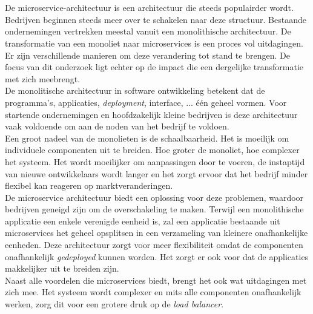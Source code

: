 
\chapter{}
\label{ch:inleiding}

De microservice-architectuur is een architectuur die steeds populairder wordt. Bedrijven beginnen steeds meer over te schakelen naar deze structuur. Bestaande ondernemingen vertrekken meestal vanuit een monolithische architectuur. De transformatie van een monoliet naar microservices is een proces vol uitdagingen. Er zijn verschillende manieren om deze verandering tot stand te brengen. De focus van dit onderzoek ligt echter op de impact die een dergelijke transformatie met zich meebrengt.\\

De monolitische architectuur in software ontwikkeling betekent dat de programma's, applicaties, \emph{deployment}, interface, ... één geheel vormen. Voor startende ondernemingen en hoofdzakelijk kleine bedrijven is deze architectuur vaak voldoende om aan de noden van het bedrijf te voldoen.\\

Een groot nadeel van de monolieten is de schaalbaarheid. Het is moeilijk om individuele componenten uit te breiden. Hoe groter de monoliet, hoe complexer het systeem. Het wordt moeilijker om aanpassingen door te voeren, de instaptijd van nieuwe ontwikkelaars wordt langer en het zorgt ervoor dat het bedrijf minder flexibel kan reageren op marktveranderingen.\\

De microservice architectuur biedt een oplossing voor deze problemen, waardoor bedrijven geneigd zijn om de overschakeling te maken. Terwijl een monolithische applicatie een enkele verenigde eenheid is, zal een applicatie bestaande uit microservices het geheel opsplitsen in een verzameling van kleinere onafhankelijke eenheden. Deze architectuur zorgt voor meer flexibiliteit omdat de componenten onafhankelijk \emph{gedeployed} kunnen worden. Het zorgt er ook voor dat de applicaties makkelijker uit te breiden zijn. \\

Naast alle voordelen die microservices biedt, brengt het ook wat uitdagingen met zich mee. Het systeem wordt complexer en mits alle componenten onafhankelijk werken, zorg dit voor een grotere druk op de \emph{load balancer}.

